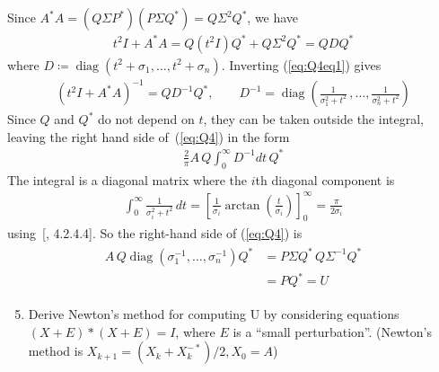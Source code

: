 \documentclass[10pt, A4paper]{article}
\DeclareMathOperator{\diag}{diag}
\begin{document}
Since $A^*A = (Q\Sigma P^*)(P\Sigma Q^*) = Q\Sigma^2Q^*$, we have
\begin{align}
	t^2I + A^*A = Q(t^2I)Q^* + Q \Sigma^2Q^* = QDQ^*
	\label{eq:Q4eq1}
\end{align}
where $D \coloneqq \diag(t^2 + \sigma_1, \ldots, t^2 + \sigma_n)$.
Inverting (\ref{eq:Q4eq1}) gives
\begin{align}
	(t^2I + A^*A)^{-1} = QD^{-1}Q^*, \qquad
	D^{-1} = \diag\left(\frac{1}{\sigma_1^2 + t^2}\, , \ldots, 
	\frac{1}{\sigma_n^2 + t^2}\right)
\end{align}
Since $Q$ and $Q^*$ do not depend on $t$, they can be taken outside the 
integral, leaving the right hand side of~(\ref{eq:Q4}) in the form
\begin{align}
	\frac{2}{\pi} A\, Q\int_{0}^{\infty}D^{-1}dt\, Q^*
\end{align}
The integral is a diagonal matrix where the $i$th diagonal component is
\begin{align}
	\int_{0}^{\infty} \frac{1}{\sigma_i^2 + t^2} \, dt =
	\left[\frac{1}{\sigma_i} \arctan \left(\frac{t}{\sigma_i}\right)
	\right]_0^{\infty} = \frac{\pi}{2\sigma_i}
\end{align}
using~[\citealp{jeda2008}, 4.2.4.4]. So the right-hand side of 
(\ref{eq:Q4}) is
\begin{align}
	\begin{split}
	A\,Q\diag\left(\sigma_1^{-1},\ldots,\sigma_n^{-1}\right)Q^*&=
	P\Sigma Q^* \, Q \Sigma^{-1}Q^* \\
	&= PQ^* = U
	\end{split}
\end{align}




\begin{enumerate}
	\setcounter{enumi}{4}
	\item Derive Newton's method for computing U by considering
	equations $(X+E)*(X+E) = I$, where $E$ is a ``small perturbation''.
	(Newton's method is $X_{k+1} = (X_k + X_k^{-*})/2, X_0 = A$)
\end{enumerate}
\end{document}
